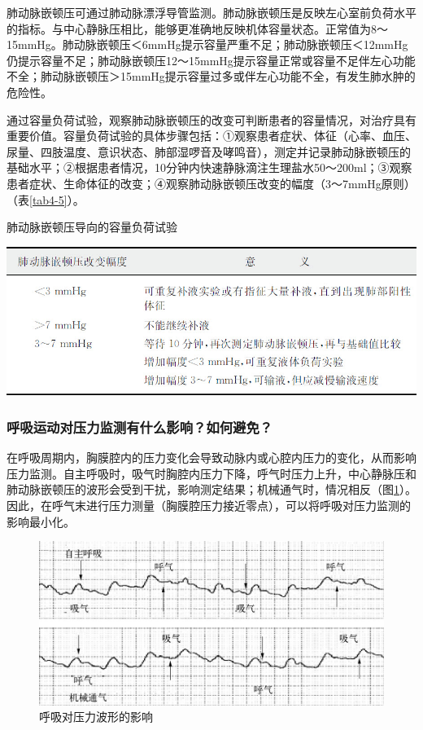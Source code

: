 肺动脉嵌顿压可通过肺动脉漂浮导管监测。肺动脉嵌顿压是反映左心室前负荷水平的指标。与中心静脉压相比，能够更准确地反映机体容量状态。正常值为8～15mmHg。肺动脉嵌顿压＜6mmHg提示容量严重不足；肺动脉嵌顿压＜12mmHg仍提示容量不足；肺动脉嵌顿压12～15mmHg提示容量正常或容量不足伴左心功能不全；肺动脉嵌顿压＞15mmHg提示容量过多或伴左心功能不全，有发生肺水肿的危险性。

通过容量负荷试验，观察肺动脉嵌顿压的改变可判断患者的容量情况，对治疗具有重要价值。容量负荷试验的具体步骤包括：①观察患者症状、体征（心率、血压、尿量、四肢温度、意识状态、肺部湿啰音及哮鸣音），测定并记录肺动脉嵌顿压的基础水平；②根据患者情况，10分钟内快速静脉滴注生理盐水50～200ml；③观察患者症状、生命体征的改变；④观察肺动脉嵌顿压改变的幅度（3～7mmHg原则）（表\ref{tab4-5}）。

\begin{table}[htbp]
\centering
\caption{肺动脉嵌顿压导向的容量负荷试验}
\label{tab4-5}
\includegraphics{./images/Image00040.jpg}
\end{table}

\subsubsection{呼吸运动对压力监测有什么影响？如何避免？}

在呼吸周期内，胸膜腔内的压力变化会导致动脉内或心腔内压力的变化，从而影响压力监测。自主呼吸时，吸气时胸腔内压力下降，呼气时压力上升，中心静脉压和肺动脉嵌顿压的波形会受到干扰，影响测定结果；机械通气时，情况相反（图\ref{fig4-9}）。因此，在呼气末进行压力测量（胸膜腔压力接近零点），可以将呼吸对压力监测的影响最小化。

\begin{figure}[!htbp]
 \centering
 \includegraphics{./images/Image00041.jpg}
 \captionsetup{justification=centering}
 \caption{呼吸对压力波形的影响}
 \label{fig4-9}
  \end{figure} 

